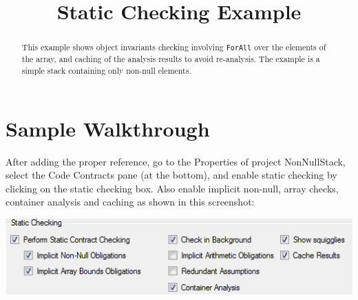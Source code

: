 \documentclass{article}
\title{\ProjectName{} Static Checking Example}
\date{}
\newcommand{\ProjectName}{NonNullStack}
\newcommand{\code}[1]{\lstinline{#1}}
\begin{document}
\maketitle
\begin{abstract}
This example shows  object invariants checking involving \code{ForAll} over the elements of the array, and caching of the analysis results to avoid re-analysis.
The example is a simple stack containing only non-null elements. 
\end{abstract}



\section{Sample Walkthrough}
\label{sec:start}

After adding the proper reference, go to the Properties of project
\textsf{\ProjectName}, select the Code Contracts pane (at the bottom), and enable static checking by clicking on the static checking box. 
Also enable implicit non-null, array checks, container analysis and caching as shown in this screenshot:
\begin{center}
  \includegraphics[width=.8\columnwidth]{ex1.png}
\end{center}
\end{document}
